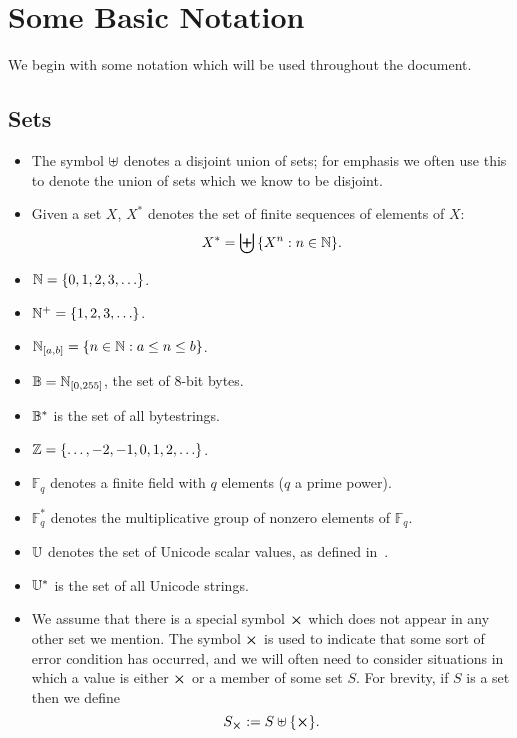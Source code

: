 \section{Some Basic Notation}
We begin with some notation which will be used throughout the document.

\subsection{Sets}
\label{sec:notation-sets}
\begin{itemize}
  \item The symbol $\uplus$ denotes a disjoint union of sets;  for emphasis we often use this
    to denote the union of sets which we know to be disjoint.
  \item Given a set $X$, $X^*$ denotes the set of finite sequences of elements of $X$:
    $$
    X^*= \biguplus{\{X^n: n \in \mathbb{N}\}}.
    $$
  \item $\mathbb{N} = \{0,1,2,3,\ldots\}$.
  \item $\mathbb{N}^{+} = \{1,2,3,\ldots\}$.
  \item $\mathbb{N}_{[a,b]} = \{n \in \mathbb{N}: a \leq n \leq b\}$.
  \item $\mathbb{B} = \mathbb{N}_{[0,255]}$, the set of 8-bit bytes.
  \item $\mathbb{B}^*$ is the set of all bytestrings.
  \item $\mathbb{Z} = \{\ldots, -2, -1, 0, 1, 2, \ldots\}$.
  \item $\mathbb{F}_q$ denotes a finite field with $q$ elements ($q$ a prime power).
  \item $\mathbb{F}_q^*$ denotes the multiplicative group of nonzero elements of $\mathbb{F}_q$.
  \item $\mathbb{U}$ denotes the set of Unicode scalar values, as defined in~\cite[Definition D76]{Unicode-standard}.
  \item $\mathbb{U}^*$ is the set of all Unicode strings.
  \item We assume that there is a special symbol $\errorX$ which does not appear
    in any other set we mention.  The symbol $\errorX$ is used to indicate that
    some sort of error condition has occurred, and we will often need to consider
    situations in which a value is either $\errorX$ or a member of some set $S$.
    For brevity, if $S$ is a set then we define
    $$
    \withError{S} := S \disj \{\errorX\}.
    $$
\end{itemize}%
%
%
%
%
%
%
%
%
%
%
%
%

